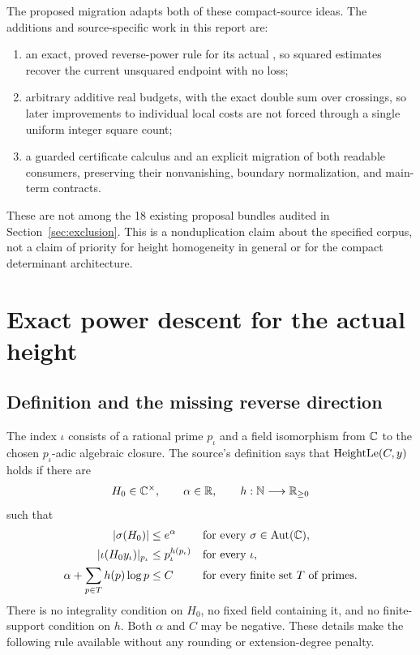 The proposed migration adapts both of these compact-source ideas.
The additions and source-specific work in this report are:
\begin{enumerate}
\item an exact, proved reverse-power rule for its actual ,
so squared estimates recover the current unsquared endpoint with no loss;
\item arbitrary additive real budgets, with the exact double sum over
crossings, so later improvements to individual
local costs are not forced through a single uniform integer square count;
\item a guarded certificate calculus and an explicit migration of both
readable consumers, preserving their nonvanishing, boundary normalization,
and main-term contracts.
\end{enumerate}
These are not among the 18 existing proposal bundles audited in
Section~\ref{sec:exclusion}. This is a nonduplication claim about the specified
corpus, not a claim of priority for height homogeneity in general or
for the compact determinant architecture.

\section{Exact power descent for the actual height}
\label{sec:root}

\subsection{Definition and the missing reverse direction}

The index \(\iota\) consists of a rational prime \(p_\iota\) and a field
isomorphism from \(\mathbb C\) to the chosen \(p_\iota\)-adic algebraic closure.
The source's definition
 says that
\(\operatorname{HeightLe}(C,y)\) holds if there are
\[
 H_0\in\mathbb C^\times,\qquad \alpha\in\mathbb R,\qquad
 h:\mathbb N\longrightarrow\mathbb R_{\ge0}
\]
such that
\begin{align}
 |\sigma(H_0)|&\le e^\alpha
       &&\text{for every }\sigma\in\operatorname{Aut}(\mathbb C), \label{eq:arch}\\
 |\iota(H_0y_\iota)|_{p_\iota}&\le
       p_\iota^{h(p_\iota)}
       &&\text{for every }\iota, \label{eq:local}\\
 \alpha+\sum_{p\in T}h(p)\log p&\le C
       &&\text{for every finite set \(T\) of primes}. \label{eq:budget}
\end{align}
There is no integrality condition on \(H_0\), no fixed field containing it,
and no finite-support condition on \(h\). Both \(\alpha\) and \(C\) may be
negative. These details make the following rule available without any
rounding or extension-degree penalty.

